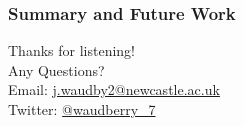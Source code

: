 \documentclass[aspectratio=169]{beamer}
\begin{document}
\begin{frame}
  \frametitle{Summary and Future Work}
  \begin{itemize}
  \end{itemize}
\end{frame}

\begin{frame}[standout]
 Thanks for listening! \\
  \vspace{4mm}
  Any Questions? \\
  \vspace{4mm}
  {\normalsize Email: \href{mailto:j.waudby2@newcastle.ac.uk}{j.waudby2@newcastle.ac.uk}} \\
  {\normalsize Twitter: \href{https://twitter.com/waudberry_7}{@waudberry\_7}}
\end{frame}
\end{document}
